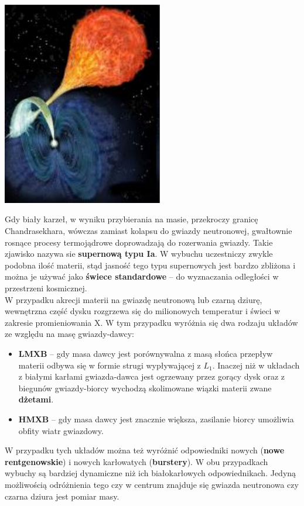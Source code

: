 \documentclass[../index.tex]{subfiles}
\begin{document}
            \begin{center}
                \includegraphics[width=7cm]{images/polar.png}
            \end{center}
            Gdy biały karzeł, w wyniku przybierania na masie, przekroczy granicę Chandrasekhara, wówczas zamiast kolapsu do gwiazdy neutronowej, gwałtownie rosnące procesy termojądrowe doprowadzają do rozerwania gwiazdy. Takie zjawisko nazywa sie \textbf{supernową typu Ia}. W wybuchu uczestniczy zwykle podobna ilość materii, stąd jasność tego typu supernowych jest bardzo zbliżona i można je używać jako \textbf{świece standardowe} – do wyznaczania odległości w przestrzeni kosmicznej.\\ 
            W przypadku akrecji materii na gwiazdę neutronową lub czarną dziurę, wewnętrzna część dysku rozgrzewa się do milionowych temperatur i świeci w zakresie promieniowania X. W tym przypadku wyróżnia się dwa rodzaju układów ze względu na masę gwiazdy-dawcy:
            \begin{itemize}
                \item \textbf{LMXB} – gdy masa dawcy jest porównywalna z masą słońca przepływ materii odbywa się w formie strugi wypływającej z \(L_1\). Inaczej niż w układach z białymi karłami gwiazda-dawca jest ogrzewany przez gorący dysk oraz z biegunów gwiazdy-biorcy wychodzą skolimowane wiązki materii zwane \textbf{dżetami}.
                \item \textbf{HMXB} – gdy masa dawcy jest znacznie większa, zasilanie biorcy umożliwia obfity wiatr gwiazdowy.
            \end{itemize}
            W przypadku tych układów można też wyróżnić odpowiedniki nowych (\textbf{nowe rentgenowskie}) i nowych karłowatych (\textbf{burstery}). W obu przypadkach wybuchy są bardziej dynamiczne niż ich białokarłowych odpowiednikach. Jedyną możliwością odróżnienia tego czy w centrum znajduje się gwiazda neutronowa czy czarna dziura jest pomiar masy.
\end{document}
